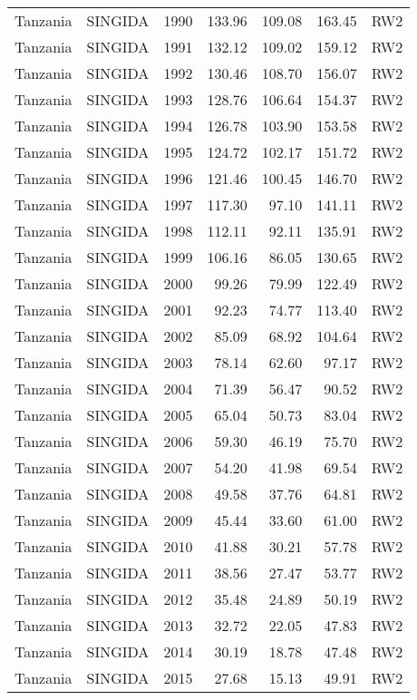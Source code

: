 \begin{longtable}{lllrrrl}
  Tanzania & SINGIDA & 1990 & 133.96 & 109.08 & 163.45 & RW2 \\ 
  Tanzania & SINGIDA & 1991 & 132.12 & 109.02 & 159.12 & RW2 \\ 
  Tanzania & SINGIDA & 1992 & 130.46 & 108.70 & 156.07 & RW2 \\ 
  Tanzania & SINGIDA & 1993 & 128.76 & 106.64 & 154.37 & RW2 \\ 
  Tanzania & SINGIDA & 1994 & 126.78 & 103.90 & 153.58 & RW2 \\ 
  Tanzania & SINGIDA & 1995 & 124.72 & 102.17 & 151.72 & RW2 \\ 
  Tanzania & SINGIDA & 1996 & 121.46 & 100.45 & 146.70 & RW2 \\ 
  Tanzania & SINGIDA & 1997 & 117.30 & 97.10 & 141.11 & RW2 \\ 
  Tanzania & SINGIDA & 1998 & 112.11 & 92.11 & 135.91 & RW2 \\ 
  Tanzania & SINGIDA & 1999 & 106.16 & 86.05 & 130.65 & RW2 \\ 
  Tanzania & SINGIDA & 2000 & 99.26 & 79.99 & 122.49 & RW2 \\ 
  Tanzania & SINGIDA & 2001 & 92.23 & 74.77 & 113.40 & RW2 \\ 
  Tanzania & SINGIDA & 2002 & 85.09 & 68.92 & 104.64 & RW2 \\ 
  Tanzania & SINGIDA & 2003 & 78.14 & 62.60 & 97.17 & RW2 \\ 
  Tanzania & SINGIDA & 2004 & 71.39 & 56.47 & 90.52 & RW2 \\ 
  Tanzania & SINGIDA & 2005 & 65.04 & 50.73 & 83.04 & RW2 \\ 
  Tanzania & SINGIDA & 2006 & 59.30 & 46.19 & 75.70 & RW2 \\ 
  Tanzania & SINGIDA & 2007 & 54.20 & 41.98 & 69.54 & RW2 \\ 
  Tanzania & SINGIDA & 2008 & 49.58 & 37.76 & 64.81 & RW2 \\ 
  Tanzania & SINGIDA & 2009 & 45.44 & 33.60 & 61.00 & RW2 \\ 
  Tanzania & SINGIDA & 2010 & 41.88 & 30.21 & 57.78 & RW2 \\ 
  Tanzania & SINGIDA & 2011 & 38.56 & 27.47 & 53.77 & RW2 \\ 
  Tanzania & SINGIDA & 2012 & 35.48 & 24.89 & 50.19 & RW2 \\ 
  Tanzania & SINGIDA & 2013 & 32.72 & 22.05 & 47.83 & RW2 \\ 
  Tanzania & SINGIDA & 2014 & 30.19 & 18.78 & 47.48 & RW2 \\ 
  Tanzania & SINGIDA & 2015 & 27.68 & 15.13 & 49.91 & RW2 \\ 

\end{longtable}
